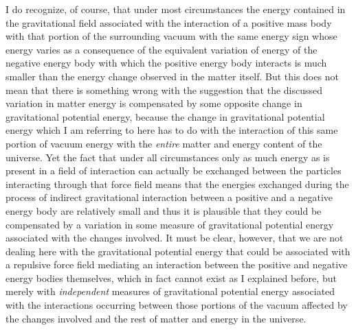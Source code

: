 \documentclass[notitlepage,12pt]{report}
\begin{document}
I do recognize, of course, that under most circumstances the energy contained in the gravitational field associated with the interaction of a positive mass body with that portion of the surrounding vacuum with the same energy sign whose energy varies as a consequence of the equivalent variation of energy of the negative energy body with which the positive energy body interacts is much smaller than the energy change observed in the matter itself. But this does not mean that there is something wrong with the suggestion that the discussed variation in matter energy is compensated by some opposite change in gravitational potential energy, because the change in gravitational potential energy which I am referring to here has to do with the interaction of this same portion of vacuum energy with the \textit{entire} matter and energy content of the universe. Yet the fact that under all circumstances only as much energy as is present in a field of interaction can actually be exchanged between the particles interacting through that force field means that the energies exchanged during the process of indirect gravitational interaction between a positive and a negative energy body are relatively small and thus it is plausible that they could be compensated by a variation in some measure of gravitational potential energy associated with the changes involved. It must be clear, however, that we are not dealing here with the gravitational potential energy that could be associated with a repulsive force field mediating an interaction between the positive and negative energy bodies themselves, which in fact cannot exist as I explained before, but merely with \textit{independent} measures of gravitational potential energy associated with the interactions occurring between those portions of the vacuum affected by the changes involved and the rest of matter and energy in the universe.
\end{document}
